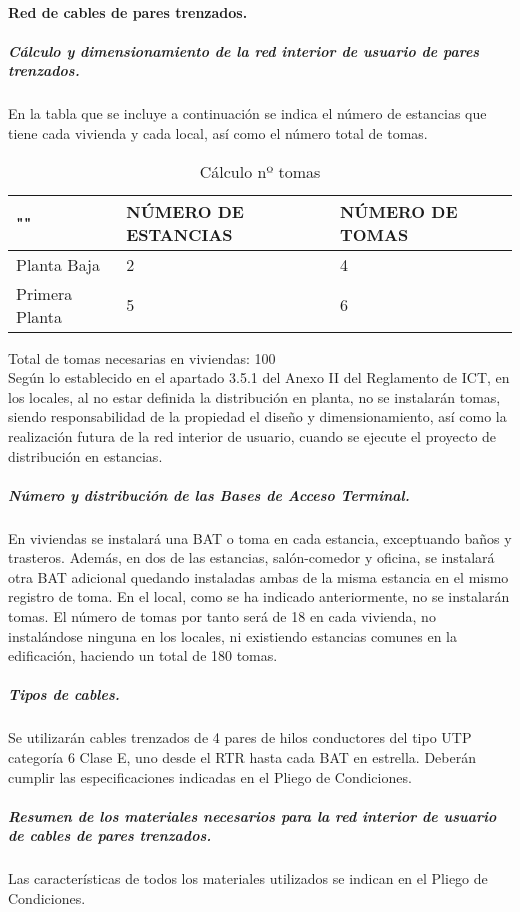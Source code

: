 \paragraph{Red de cables de pares trenzados.}
\subparagraph{Cálculo y dimensionamiento de la red interior de usuario de pares trenzados.}
En la tabla que se incluye a continuación se indica el número de estancias que tiene cada
vivienda y cada local, así como el número total de tomas.
\begin{table}[H]
\centering
\begin{tabular}{|p{5cm} |p{5cm} |p{5cm}|}
\hline
""&NÚMERO DE ESTANCIAS&NÚMERO DE TOMAS\\
\hline \hline
Planta Baja&2&4\\
\hline
Primera Planta&5&6\\
\hline
\end{tabular}
\caption{Cálculo nº tomas}
\label{tabla:autores}
\end{table}
Total de tomas necesarias en viviendas: 100\\
Según lo establecido en el apartado 3.5.1 del Anexo II del Reglamento de ICT, en los locales, al
no estar definida la distribución en planta, no se instalarán tomas, siendo responsabilidad de la
propiedad el diseño y dimensionamiento, así como la realización futura de la red interior de
usuario, cuando se ejecute el proyecto de distribución en estancias.
\subparagraph{Número y distribución de las Bases de Acceso Terminal.}
En viviendas se instalará una BAT o toma en cada estancia, exceptuando baños y trasteros.
Además, en dos de las estancias, salón-comedor y oficina, se instalará otra BAT adicional
quedando instaladas ambas de la misma estancia en el mismo registro de toma.
En el local, como se ha indicado anteriormente, no se instalarán tomas.
El número de tomas por tanto será de 18 en cada vivienda, no instalándose ninguna en los locales,
ni existiendo estancias comunes en la edificación, haciendo un total de 180 tomas.
\subparagraph{Tipos de cables.}
Se utilizarán cables trenzados de 4 pares de hilos conductores del tipo UTP categoría 6 Clase E,
uno desde el RTR hasta cada BAT en estrella.
Deberán cumplir las especificaciones indicadas en el Pliego de
Condiciones.
\subparagraph{Resumen de los materiales necesarios para la red interior de usuario de cables de pares trenzados.}
Las características de todos los materiales utilizados se indican en el Pliego de Condiciones.

